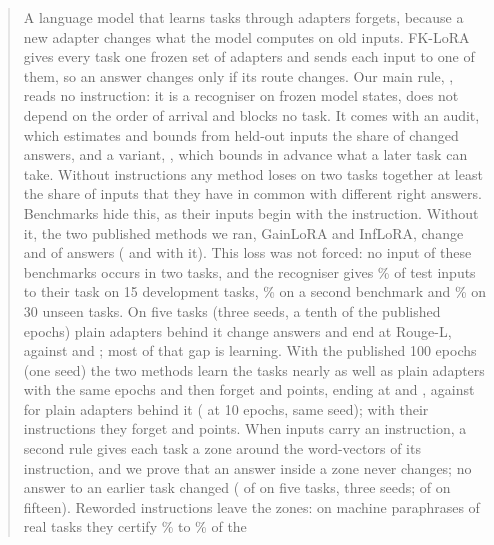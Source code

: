 \begin{abstract}
A language model that learns tasks through adapters forgets, because a new adapter changes what the
model computes on old inputs. FK-LoRA gives every task one frozen set of adapters and sends each input
to one of them, so an answer changes only if its route changes. Our main rule,
\recog{}, reads no instruction: it is a recogniser on frozen model states, does not depend on the order of arrival and blocks no task. It comes with an audit, which estimates and bounds from held-out inputs the
share of changed answers, and a variant, \handicap{}, which bounds in advance what a later task
can take. Without instructions any method loses on two tasks together at least the share of inputs that they have in common with different
right answers. Benchmarks hide this, as their inputs begin with the instruction. Without it, the two
published methods we ran, GainLoRA and InfLoRA, change \AudSeedsGainloraChanged{} and
\AudSeedsInfloraChanged{} of \AudSeedsCompared{} answers (\FiveGainChanged{} and \FiveInfChanged{}
with it). This loss was not forced: no input of these benchmarks occurs in two tasks, and the recogniser gives \AudDevLLamOneEnd{}\% of test inputs to their task on 15 development tasks,
\AudScaleLongThreeEnd{}\% on a second benchmark and \AudFreshFourthLEnd{}\% on 30 unseen tasks. On five tasks (three seeds, a tenth of the published epochs) plain adapters behind it change \AudSeedsRidgeChanged{} answers and end at
\AudSeedsRidgeAPOne{} Rouge-L, against \AudSeedsGainloraAPOne{} and \AudSeedsInfloraAPOne{}; most of that gap is learning. With the published 100 epochs (one seed) the two methods learn the tasks nearly as well as plain adapters with the same epochs and
then forget \AudFullGainloraFTInt{} and \AudFullInfloraFTInt{} points, ending at
\AudFullGainloraAPOne{} and \AudFullInfloraAPOne{}, against \AudFullOursRidgeAPOne{} for plain
adapters behind it (\AudOursRidgeAPOne{} at 10 epochs, same seed); with their instructions they forget \AudFullDefOriginalGainloraFTOne{} and \AudFullDefOriginalInfloraFTOne{} points. When inputs
carry an instruction, a second rule gives each task a zone around the word-vectors of its
instruction, and we prove that an answer inside a zone never changes; no answer to an earlier task changed (\FiveCertChanged{} of \FiveCertCompared{}
on five tasks, three seeds; \FifteenCertChanged{} of \FifteenCertCompared{} on fifteen). Reworded instructions leave the zones: on machine paraphrases of
\WidenTasksEval{} real tasks they certify \WidenRefTfivePLow{}\% to \WidenRefTfivePHigh{}\% of the

\end{abstract}
